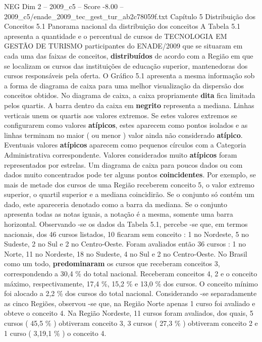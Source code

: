 \begin{textsample}{NEG Dim 2 – 2009\_c5 – Score -8.00 – 2009\_c5/enade\_2009\_tec\_gest\_tur\_ab2c78059f.txt}  \label{ex:f2_neg_007}
Capítulo 5 Distribuição dos Conceitos 5.1 Panorama nacional da distribuição dos conceitos A Tabela 5.1 apresenta a quantidade e o percentual de cursos de TECNOLOGIA EM GESTÃO DE TURISMO participantes do ENADE/2009 que se situaram em cada uma das faixas de conceitos, \textbf{distribuídos} de acordo com a Região em que se localizam os cursos das instituições de educação superior, mantenedoras dos cursos responsáveis pela oferta.
O Gráfico 5.1 apresenta a mesma informação sob a forma de diagrama de caixa para uma melhor visualização da dispersão dos conceitos obtidos.
No diagrama de caixa, a caixa propriamente \textbf{dita} fica limitada pelos quartis.
A barra dentro da caixa em \textbf{negrito} representa a mediana.
Linhas verticais unem os quartis aos valores extremos.
Se estes valores extremos se configurarem como valores \textbf{atípicos}, estes aparecem como pontos isolados e as linhas terminam no maior ( ou menor ) valor ainda não considerado \textbf{atípico}.
Eventuais valores \textbf{atípicos} aparecem como pequenos círculos com a Categoria Administrativa correspondente.
Valores considerados muito \textbf{atípicos} foram representados por estrelas.
Um diagrama de caixa para poucos dados ou com dados muito concentrados pode ter alguns pontos \textbf{coincidentes}.
Por exemplo, se mais de metade dos cursos de uma Região receberem conceito 5, o valor extremo superior, o quartil superior e a mediana coincidirão.
Se o conjunto só contém um dado, este apareceria denotado como a barra da mediana.
Se o conjunto apresenta todas as notas iguais, a notação é a mesma, somente uma barra horizontal.
Observando -se os dados da Tabela 5.1, percebe -se que, em termos nacionais, dos 46 cursos listados, 10 ficaram sem conceito : 1 no Nordeste, 5 no Sudeste, 2 no Sul e 2 no Centro-Oeste.
Foram avaliados então 36 cursos : 1 no Norte, 11 no Nordeste, 18 no Sudeste, 4 no Sul e 2 no Centro-Oeste.
No Brasil como um todo, \textbf{predominaram} os cursos que receberam conceitos 3, correspondendo a 30,4 \% do total nacional.
Receberam conceitos 4, 2 e o conceito máximo, respectivamente, 17,4 \%, 15,2 \% e 13,0 \% dos cursos.
O conceito mínimo foi alocado a 2,2 \% dos cursos do total nacional.
Considerando -se separadamente as cinco Regiões, observou -se que, na Região Norte apenas 1 curso foi avaliado e obteve o conceito 4.
Na Região Nordeste, 11 cursos foram avaliados, dos quais, 5 cursos ( 45,5 \% ) obtiveram conceito 3, 3 cursos ( 27,3 \% ) obtiveram conceito 2 e 1 curso ( 3,19,1 \% ) o conceito 4.

\end{textsample}
